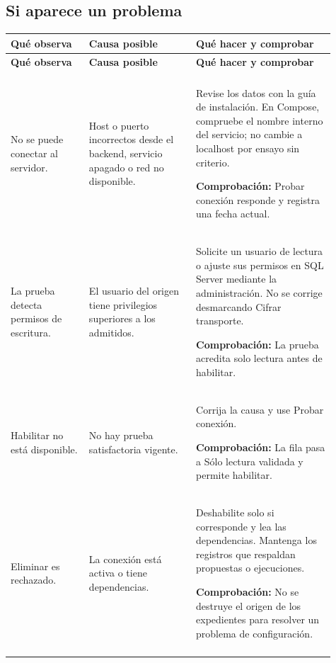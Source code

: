 \subsection{Si aparece un problema}
\begingroup
\fontsize{10}{12.5}\selectfont
\setlength{\tabcolsep}{5pt}
\renewcommand{\arraystretch}{1.15}
\begin{longtable}{@{}>{\RaggedRight\arraybackslash}p{0.22\linewidth}>{\RaggedRight\arraybackslash}p{0.3\linewidth}>{\RaggedRight\arraybackslash}p{0.39\linewidth}@{}}
\toprule
\textbf{Qué observa} & \textbf{Causa posible} & \textbf{Qué hacer y comprobar} \\
\midrule
\endfirsthead
\toprule
\textbf{Qué observa} & \textbf{Causa posible} & \textbf{Qué hacer y comprobar} \\
\midrule
\endhead
\midrule
\multicolumn{3}{r}{\footnotesize Continúa en la página siguiente}\\
\endfoot
\bottomrule
\endlastfoot
No se puede conectar al servidor. & Host o puerto incorrectos desde el backend, servicio apagado o red no disponible. & Revise los datos con la guía de instalación. En Compose, compruebe el nombre interno del servicio; no cambie a localhost por ensayo sin criterio.\par\smallskip\textbf{Comprobación:} Probar conexión responde y registra una fecha actual. \\
\addlinespace[3pt]
La prueba detecta permisos de escritura. & El usuario del origen tiene privilegios superiores a los admitidos. & Solicite un usuario de lectura o ajuste sus permisos en SQL Server mediante la administración. No se corrige desmarcando Cifrar transporte.\par\smallskip\textbf{Comprobación:} La prueba acredita solo lectura antes de habilitar. \\
\addlinespace[3pt]
Habilitar no está disponible. & No hay prueba satisfactoria vigente. & Corrija la causa y use Probar conexión.\par\smallskip\textbf{Comprobación:} La fila pasa a Sólo lectura validada y permite habilitar. \\
\addlinespace[3pt]
Eliminar es rechazado. & La conexión está activa o tiene dependencias. & Deshabilite solo si corresponde y lea las dependencias. Mantenga los registros que respaldan propuestas o ejecuciones.\par\smallskip\textbf{Comprobación:} No se destruye el origen de los expedientes para resolver un problema de configuración. \\
\addlinespace[3pt]
\end{longtable}
\endgroup

